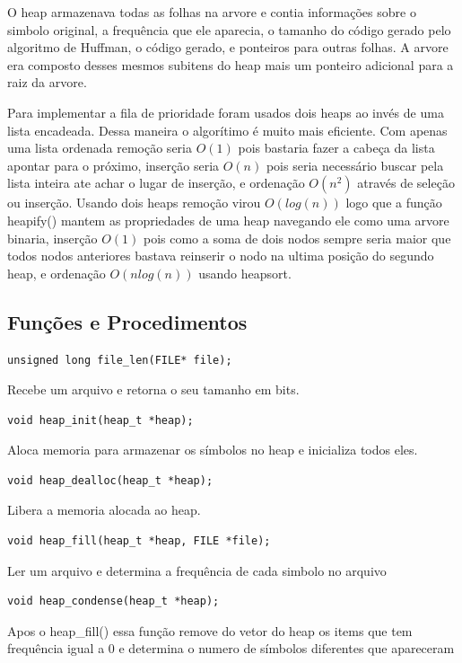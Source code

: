 \documentclass[a4paper, 11pt]{article}
\begin{document}
O heap armazenava todas as folhas na arvore e contia informações sobre o simbolo original, a frequência que ele aparecia, o tamanho do código gerado pelo algoritmo de Huffman, o código gerado, e ponteiros para outras folhas. A arvore era composto desses mesmos subitens do heap mais um ponteiro adicional para a raiz da arvore.

Para implementar a fila de prioridade foram usados dois heaps ao invés de uma lista encadeada. Dessa maneira o algorítimo é muito mais eficiente. Com apenas uma lista ordenada remoção seria $O(1)$ pois bastaria fazer a cabeça da lista apontar para o próximo, inserção seria $O(n)$ pois seria necessário buscar pela lista inteira ate achar o lugar de inserção, e ordenação $O(n^2)$ através de seleção ou inserção. Usando dois heaps remoção virou $O(log(n))$ logo que a função heapify() mantem as propriedades de uma heap navegando ele como uma arvore binaria, inserção $O(1)$ pois como a soma de dois nodos sempre seria maior que todos nodos anteriores bastava reinserir o nodo na ultima posição do segundo heap, e ordenação $O(nlog(n))$ usando heapsort.

\subsection{Funções e Procedimentos}
\begin{verbatim}
unsigned long file_len(FILE* file);
\end{verbatim} 
Recebe um arquivo e retorna o seu tamanho em bits.

\begin{verbatim}
void heap_init(heap_t *heap);
\end{verbatim} 
Aloca memoria para armazenar os símbolos no heap e inicializa todos eles.

\begin{verbatim}
void heap_dealloc(heap_t *heap);
\end{verbatim} 
Libera a memoria alocada ao heap.

\begin{verbatim}
void heap_fill(heap_t *heap, FILE *file);
\end{verbatim} 
Ler um arquivo e determina a frequência de cada simbolo no arquivo

\begin{verbatim}
void heap_condense(heap_t *heap);
\end{verbatim} 
Apos o heap\_fill() essa função remove do vetor do heap os items que tem frequência igual a 0 e determina o numero de símbolos diferentes que apareceram
\end{document}
